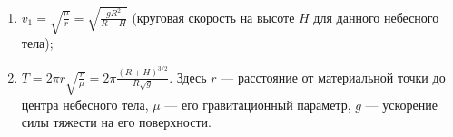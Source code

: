 \begin{enumerate}
	\item $v_1 = \sqrt{\frac{\mu}{r}} =
	\sqrt{\frac{gR^2}{R + H}}$
	(круговая скорость на высоте $H$ для данного небесного тела);
	\item $T = 2\pi r\sqrt{\frac{r}{\mu}} =
	2\pi\frac{(R+H)^{ 3/2 }}{R\sqrt{g}}$.
	Здесь $r$ --- расстояние от материальной точки до центра небесного тела,
	$\mu$ --- его гравитационный параметр,
	$g$ ---	ускорение силы тяжести на его поверхности.
\end{enumerate}

